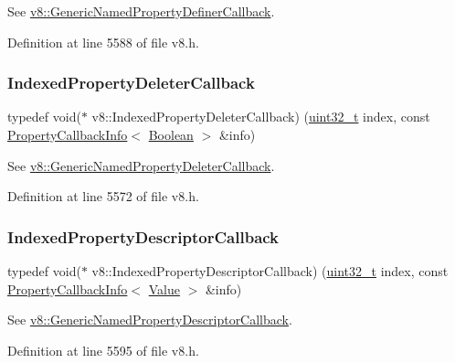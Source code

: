See {\ttfamily \mbox{\hyperlink{namespacev8_a66c854bc88d612ab4c65354bc0dc74a0}{v8\+::\+Generic\+Named\+Property\+Definer\+Callback}}}. 

Definition at line 5588 of file v8.\+h.

\mbox{\label{namespacev8_a53863728de14cde48dd6543207b2f2da}} 
\subsubsection{\texorpdfstring{Indexed\+Property\+Deleter\+Callback}{IndexedPropertyDeleterCallback}}
{\footnotesize\ttfamily typedef void($\ast$ v8\+::\+Indexed\+Property\+Deleter\+Callback) (\mbox{\hyperlink{classuint32__t}{uint32\+\_\+t}} index, const \mbox{\hyperlink{classv8_1_1PropertyCallbackInfo}{Property\+Callback\+Info}}$<$ \mbox{\hyperlink{classv8_1_1Boolean}{Boolean}} $>$ \&info)}

See {\ttfamily \mbox{\hyperlink{namespacev8_ad2aecc0406ea4bc02d5a4f84a433b273}{v8\+::\+Generic\+Named\+Property\+Deleter\+Callback}}}. 

Definition at line 5572 of file v8.\+h.

\mbox{\label{namespacev8_a7506e91d70d885b5cbeabdf870ac0e88}} 
\subsubsection{\texorpdfstring{Indexed\+Property\+Descriptor\+Callback}{IndexedPropertyDescriptorCallback}}
{\footnotesize\ttfamily typedef void($\ast$ v8\+::\+Indexed\+Property\+Descriptor\+Callback) (\mbox{\hyperlink{classuint32__t}{uint32\+\_\+t}} index, const \mbox{\hyperlink{classv8_1_1PropertyCallbackInfo}{Property\+Callback\+Info}}$<$ \mbox{\hyperlink{classv8_1_1Value}{Value}} $>$ \&info)}

See {\ttfamily \mbox{\hyperlink{namespacev8_a8cf8faa26baffa84173a24906c0d49f6}{v8\+::\+Generic\+Named\+Property\+Descriptor\+Callback}}}. 

Definition at line 5595 of file v8.\+h.

\mbox{\label{namespacev8_adbb0a6d5537371953f9ba807d4f6275e}} 
